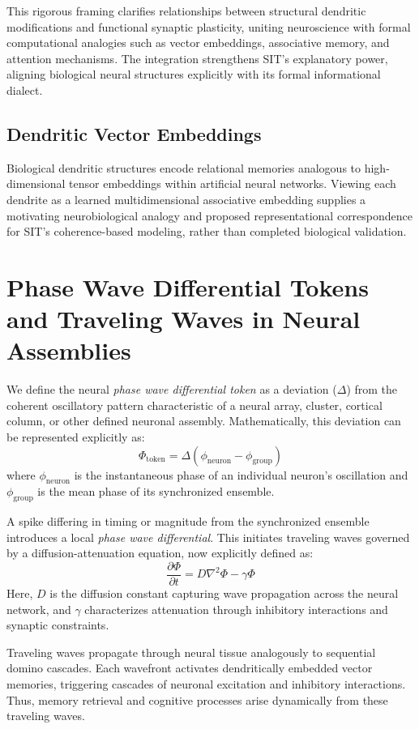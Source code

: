 This rigorous framing clarifies relationships between structural dendritic modifications and functional synaptic plasticity, uniting neuroscience with formal computational analogies such as vector embeddings, associative memory, and attention mechanisms. The integration strengthens SIT's explanatory power, aligning biological neural structures explicitly with its formal informational dialect.

\subsection{Dendritic Vector Embeddings}

Biological dendritic structures encode relational memories analogous to high-dimensional tensor embeddings within artificial neural networks. Viewing each dendrite as a learned multidimensional associative embedding supplies a motivating neurobiological analogy and proposed representational correspondence for SIT's coherence-based modeling, rather than completed biological validation.

\section{Phase Wave Differential Tokens and Traveling Waves in Neural Assemblies}

We define the neural \emph{phase wave differential token} as a deviation ($\Delta$) from the coherent oscillatory pattern characteristic of a neural array, cluster, cortical column, or other defined neuronal assembly. Mathematically, this deviation can be represented explicitly as:
\[
\Phi_{\text{token}} = \Delta (\phi_{\text{neuron}} - \phi_{\text{group}})
\]
where $\phi_{\text{neuron}}$ is the instantaneous phase of an individual neuron's oscillation and $\phi_{\text{group}}$ is the mean phase of its synchronized ensemble.

A spike differing in timing or magnitude from the synchronized ensemble introduces a local \emph{phase wave differential}. This initiates traveling waves governed by a diffusion-attenuation equation, now explicitly defined as:
\[
\frac{\partial \Phi}{\partial t} = D \nabla^2 \Phi - \gamma \Phi
\]
Here, $D$ is the diffusion constant capturing wave propagation across the neural network, and $\gamma$ characterizes attenuation through inhibitory interactions and synaptic constraints.

Traveling waves propagate through neural tissue analogously to sequential domino cascades. Each wavefront activates dendritically embedded vector memories, triggering cascades of neuronal excitation and inhibitory interactions. Thus, memory retrieval and cognitive processes arise dynamically from these traveling waves.

